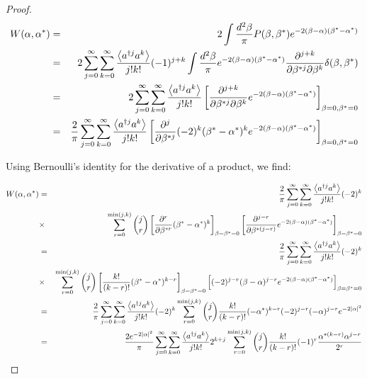 \begin{proof}
\begin{eqnarray} \label{gaussian_smooth}
    W(\alpha, \alpha^*) &=& 2 \int \frac{d^2 \beta}{\pi} P(\beta, \beta^*) e^{-2 (\beta - \alpha) (\beta^* - \alpha^*)}\\
    &=& 2 \sum_{j=0}^\infty \sum_{k=0}^\infty \frac{\left\langle a^{\dagger j} a^k \right\rangle}{j! k!} (-1)^{j+k} \int \frac{d^2 \beta}{\pi} e^{-2 (\beta - \alpha) (\beta^* - \alpha^*)} \frac{\partial^{j+k}}{\partial \beta^{* j} \partial \beta^k}  \delta(\beta, \beta^*) \nonumber\\
    &=& 2 \sum_{j=0}^\infty \sum_{k=0}^\infty \frac{\left\langle a^{\dagger j} a^k \right\rangle}{j! k!} \left[\frac{\partial^{j+k}}{\partial \beta^{* j} \partial \beta^k} e^{-2 (\beta - \alpha) (\beta^* - \alpha^*)}\right]_{\beta = 0, \beta^* = 0} \nonumber\\
    &=& \frac{2}{\pi} \sum_{j=0}^\infty \sum_{k=0}^\infty \frac{\left\langle a^{\dagger j} a^k \right\rangle}{j! k!} \left[\frac{\partial^{j}}{\partial \beta^{* j}} (-2)^k (\beta^* -\alpha^*)^k e^{-2 (\beta - \alpha) (\beta^* - \alpha^*)}\right]_{\beta = 0, \beta^* = 0} \nonumber
\end{eqnarray}

Using Bernoulli's identity for the derivative of a product, we find:

\begin{eqnarray}    
     W(\alpha, \alpha^*) &=& \frac{2}{\pi} \sum_{j=0}^\infty \sum_{k=0}^\infty \frac{\left\langle a^{\dagger j} a^k \right\rangle}{j! k!} (-2)^k\nonumber\\ &\times& \sum_{r = 0}^{\min(j, k)} \binom{j}{r} \left[\frac{\partial^{r}}{\partial \beta^{* r}} (\beta^* - \alpha^*)^k \right]_{\beta = \beta^* = 0} \left[ \frac{\partial^{j-r}}{\partial \beta^{* (j-r)}}e^{-2 (\beta - \alpha) (\beta^* - \alpha^*)}\right]_{\beta =\beta^* = 0} \nonumber\\
     &=& \frac{2}{\pi} \sum_{j=0}^\infty \sum_{k=0}^\infty \frac{\left\langle a^{\dagger j} a^k \right\rangle}{j! k!} (-2)^k \nonumber\\
     &\times& \sum_{r = 0}^{\min(j, k)} \binom{j}{r}  \left[\frac{k!}{(k-r)!}  (\beta^* - \alpha^*)^{k-r} \right]_{\beta = \beta^* = 0} \left[(-2)^{j-r} (\beta - \alpha)^{j-r}  e^{-2 (\beta - \alpha) (\beta^* - \alpha^*)}\right]_{\beta =\beta^* = 0}\nonumber\\
     &=& \frac{2}{\pi} \sum_{j=0}^\infty \sum_{k=0}^\infty \frac{\left\langle a^{\dagger j} a^k \right\rangle}{j! k!} (-2)^k \sum_{r = 0}^{\min(j, k)} \binom{j}{r}  \frac{k!}{(k-r)!} (-\alpha^*)^{k-r} (-2)^{j-r} (-\alpha)^{j-r} e^{-2 |\alpha|^2}\nonumber\\
     &=& \frac{2 e^{-2 |\alpha|^2}}{\pi} \sum_{j=0}^\infty \sum_{k=0}^\infty \frac{\left\langle a^{\dagger j} a^k \right\rangle}{j! k!} 2^{k+j} \sum_{r = 0}^{\min(j, k)} \binom{j}{r}  \frac{k!}{(k-r)!} (-1)^r \frac{\alpha^{* (k-r)} \alpha^{j-r}}{2^r}
\end{eqnarray}


\end{proof}
